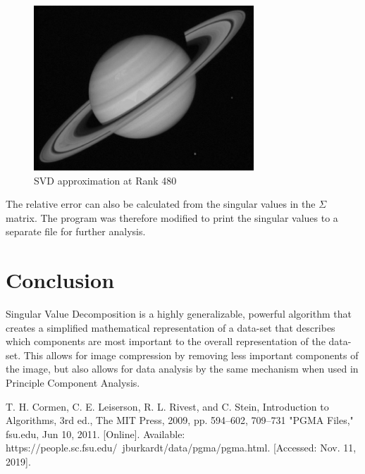 \documentclass[conference]{IEEEtran}
\begin{document}
\begin{figure}
	\centering
	\includegraphics[width=3.25in]{saturn_SVD_480.png}
	\caption{SVD approximation at Rank 480}
	\label{svd480}
\end{figure}

The relative error can also be calculated from the singular values in the $\Sigma$ matrix.
The program was therefore modified to print the singular values to a separate file for further
analysis.


\section{Conclusion}
Singular Value Decomposition is a highly generalizable, powerful algorithm that creates a simplified 
mathematical representation of a data-set that describes which components are most important to the 
overall representation of the data-set. This allows for image compression by removing less important 
components of the image, but also allows for data analysis by the same mechanism when used in Principle
Component Analysis.  


\begin{thebibliography}{00}
	 T. H. Cormen, C. E. Leiserson, R. L. Rivest, and C. Stein, Introduction to Algorithms, 3rd ed., The MIT Press, 2009, pp. 594--602, 709--731 
	 "PGMA Files," fsu.edu, Jun 10, 2011. [Online]. Available: https://people.sc.fsu.edu/~jburkardt/data/pgma/pgma.html. [Accessed: Nov. 11, 2019].
\end{thebibliography}
\end{document}
